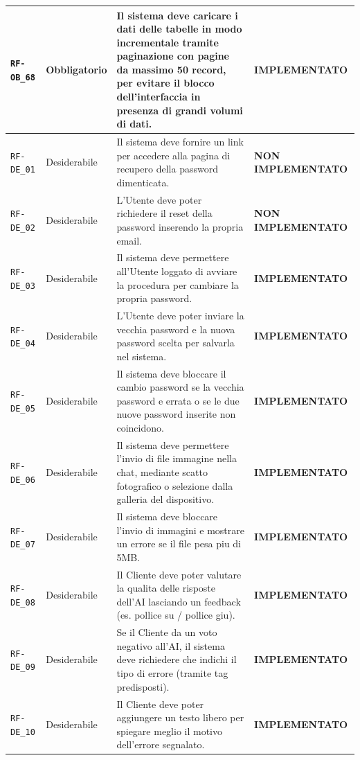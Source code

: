 \documentclass[a4paper, 11pt, oneside]{scrartcl}
\begin{document}
\begin{longtable}{|>{\raggedright\arraybackslash}p{}|>{\raggedright\arraybackslash}p{}|>{\raggedright\arraybackslash}p{}|>{\raggedright\arraybackslash}p{}|}
    \hline
    \texttt{RF-OB\_68} & Obbligatorio & Il sistema deve caricare i dati delle tabelle in modo incrementale tramite paginazione con pagine da massimo 50 record, per evitare il blocco dell'interfaccia in presenza di grandi volumi di dati. & \textbf{IMPLEMENTATO} \\
    \hline
    \texttt{RF-DE\_01} & Desiderabile & Il sistema deve fornire un link per accedere alla pagina di recupero della password dimenticata. & \textbf{NON IMPLEMENTATO} \\
    \hline
    \texttt{RF-DE\_02} & Desiderabile & L'Utente deve poter richiedere il reset della password inserendo la propria email. & \textbf{NON IMPLEMENTATO} \\
    \hline
    \texttt{RF-DE\_03} & Desiderabile & Il sistema deve permettere all'Utente loggato di avviare la procedura per cambiare la propria password. & \textbf{IMPLEMENTATO} \\
    \hline
    \texttt{RF-DE\_04} & Desiderabile & L'Utente deve poter inviare la vecchia password e la nuova password scelta per salvarla nel sistema. & \textbf{IMPLEMENTATO} \\
    \hline
    \texttt{RF-DE\_05} & Desiderabile & Il sistema deve bloccare il cambio password se la vecchia password e errata o se le due nuove password inserite non coincidono. & \textbf{IMPLEMENTATO} \\
    \hline
    \texttt{RF-DE\_06} & Desiderabile & Il sistema deve permettere l'invio di file immagine nella chat, mediante scatto fotografico o selezione dalla galleria del dispositivo. & \textbf{IMPLEMENTATO} \\
    \hline
    \texttt{RF-DE\_07} & Desiderabile & Il sistema deve bloccare l'invio di immagini e mostrare un errore se il file pesa piu di 5MB. & \textbf{IMPLEMENTATO} \\
    \hline
    \texttt{RF-DE\_08} & Desiderabile & Il Cliente deve poter valutare la qualita delle risposte dell'AI lasciando un feedback (es. pollice su / pollice giu). & \textbf{IMPLEMENTATO} \\
    \hline
    \texttt{RF-DE\_09} & Desiderabile & Se il Cliente da un voto negativo all'AI, il sistema deve richiedere che indichi il tipo di errore (tramite tag predisposti). & \textbf{IMPLEMENTATO} \\
    \hline
    \texttt{RF-DE\_10} & Desiderabile & Il Cliente deve poter aggiungere un testo libero per spiegare meglio il motivo dell'errore segnalato. & \textbf{IMPLEMENTATO} \\
    \hline

\end{longtable}
\end{document}
